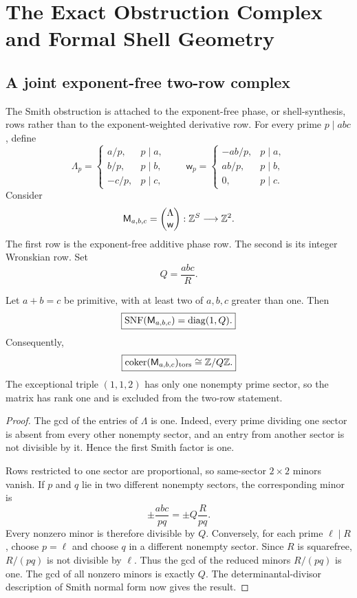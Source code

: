 \chapter{The Exact Obstruction Complex and Formal Shell Geometry}

\section{A joint exponent-free two-row complex}
The Smith obstruction is attached to the exponent-free phase, or shell-synthesis, rows rather than to the exponent-weighted derivative row. For every prime $p\mid abc$, define
\[
 \Lambda_p=
 \begin{cases}
 a/p,&p\mid a,\\
 b/p,&p\mid b,\\
 -c/p,&p\mid c,
 \end{cases}
 \qquad
 \mathsf w_p=
 \begin{cases}
 -ab/p,&p\mid a,\\
 ab/p,&p\mid b,\\
 0,&p\mid c.
 \end{cases}
\]
Consider
\[
 \mathsf M_{a,b,c}
 =
 \begin{pmatrix}
 \Lambda\\
 \mathsf w
 \end{pmatrix}:
 \mathbb Z^S\longrightarrow\mathbb Z^2.
\]
The first row is the exponent-free additive phase row. The second is its integer Wronskian row. Set
\[
 Q=\frac{abc}{R}.
\]

\begin{theorem}\label{thm:phase-smith}
Let $a+b=c$ be primitive, with at least two of $a,b,c$ greater than one. Then
\[
 \boxed{
 \operatorname{SNF}(\mathsf M_{a,b,c})
 =
 \operatorname{diag}(1,Q).
 }
\]
Consequently,
\[
 \boxed{
 \operatorname{coker}(\mathsf M_{a,b,c})_{\mathrm{tors}}
 \cong
 \mathbb Z/Q\mathbb Z.
 }
\]
The exceptional triple $(1,1,2)$ has only one nonempty prime sector, so the matrix has rank one and is excluded from the two-row statement.
\end{theorem}

\begin{proof}
The gcd of the entries of $\Lambda$ is one. Indeed, every prime dividing one sector is absent from every other nonempty sector, and an entry from another sector is not divisible by it. Hence the first Smith factor is one.

Rows restricted to one sector are proportional, so same-sector $2\times2$ minors vanish. If $p$ and $q$ lie in two different nonempty sectors, the corresponding minor is
\[
 \pm\frac{abc}{pq}
 =
 \pm Q\frac{R}{pq}.
\]
Every nonzero minor is therefore divisible by $Q$. Conversely, for each prime $\ell\mid R$, choose $p=\ell$ and choose $q$ in a different nonempty sector. Since $R$ is squarefree, $R/(pq)$ is not divisible by $\ell$. Thus the gcd of the reduced minors $R/(pq)$ is one. The gcd of all nonzero minors is exactly $Q$. The determinantal-divisor description of Smith normal form now gives the result.
\end{proof}

